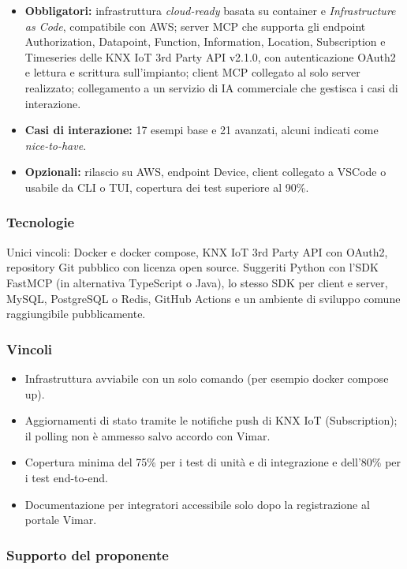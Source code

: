 \begin{itemize}
    \item \textbf{Obbligatori:} infrastruttura \emph{cloud-ready} basata su container e \emph{Infrastructure as Code}, compatibile con AWS; server MCP che supporta gli endpoint Authorization, Datapoint, Function, Information, Location, Subscription e Timeseries delle KNX IoT 3rd Party API v2.1.0, con autenticazione OAuth2 e lettura e scrittura sull'impianto; client MCP collegato al solo server realizzato; collegamento a un servizio di IA commerciale che gestisca i casi di interazione.
    \item \textbf{Casi di interazione:} 17 esempi base e 21 avanzati, alcuni indicati come \emph{nice-to-have}.
    \item \textbf{Opzionali:} rilascio su AWS, endpoint Device, client collegato a VSCode o usabile da CLI o TUI, copertura dei test superiore al 90\%.
\end{itemize}

\subsubsection*{Tecnologie}

Unici vincoli: Docker e docker compose, KNX IoT 3rd Party API con OAuth2, repository Git pubblico con licenza open source. Suggeriti Python con l'SDK FastMCP (in alternativa TypeScript o Java), lo stesso SDK per client e server, MySQL, PostgreSQL o Redis, GitHub Actions e un ambiente di sviluppo comune raggiungibile pubblicamente.

\subsubsection*{Vincoli}

\begin{itemize}
    \item Infrastruttura avviabile con un solo comando (per esempio docker compose up).
    \item Aggiornamenti di stato tramite le notifiche push di KNX IoT (Subscription); il polling non è ammesso salvo accordo con Vimar.
    \item Copertura minima del 75\% per i test di unità e di integrazione e dell'80\% per i test end-to-end.
    \item Documentazione per integratori accessibile solo dopo la registrazione al portale Vimar.
\end{itemize}

\subsubsection*{Supporto del proponente}

